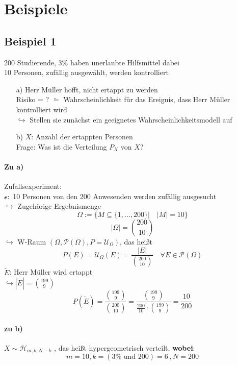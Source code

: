 \documentclass[12pt,a4paper]{article}
\begin{document}
	
	
	\section*{Beispiele}
	\subsection*{Beispiel 1}
	200 Studierende, 3\% haben unerlaubte Hilfsmittel dabei\\
	10 Personen, zufällig ausgewählt, werden kontrolliert
	\begin{itemize}
	\item[a)] Herr Müller hofft, nicht ertappt zu werden\\
	Risiko = ? $\tilde{=}$ Wahrscheinlichkeit für das Ereignis, dass Herr Müller kontrolliert wird\\
	$\hookrightarrow$ Stellen sie zunächst ein geeignetes Wahrscheinlichkeitsmodell auf
	\item[b)] $X$: Anzahl der ertappten Personen\\
	Frage: Was ist die Verteilung $P_X$ von $X$?
	\end{itemize}
	
	\paragraph{Zu a)} Zufallsexperiment:\\
	$\mathcal{e}: $ 10 Personen von den 200 Anwesenden werden zufällig ausgesucht\\
	$\hookrightarrow$ Zugehörige Ergebnismenge
	$$\Omega:=\{M\subseteq \{1,...,200\}| \quad |M|=10\}$$
	$$|\Omega |= \binom{200}{10}$$
	$\hookrightarrow$ W-Raum $(\Omega,\mathcal{P}(\Omega),P=\mathcal{U}_{\Omega})$, das heißt
	$$P(E)=\mathcal{U}_{\Omega}(E)=\frac{|E|}{\binom{200}{10}} \quad \forall E\in\mathcal{P}(\Omega)$$
	$\tilde{E}$: Herr Müller wird ertappt\\
	$\hookrightarrow |\tilde{E}|=\binom{199}{9}$
	$$P(\tilde{E})=\frac{\binom{199}{9}}{\binom{200}{10}} = \frac{\binom{199}{9}}{\frac{200}{10}\cdot \binom{199}{9}}=\frac{10}{200}$$ 
	
	\paragraph{zu b)}
	$X\sim \mathcal{H}_{m,k,N-k}$ , das heißt hypergeometrisch verteilt, \textbf{wobei}:
	$$m=10 , k=(3\% \text{ und } 200)=6 \: , N=200$$
	
	
	
\end{document}
